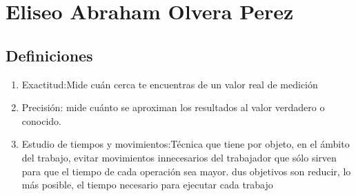 \section{Eliseo Abraham Olvera Perez}
\subsection{Definiciones}

\begin{enumerate}
    \item Exactitud:Mide cuán cerca te encuentras de un valor real de medición
    \item Precisión: mide cuánto se aproximan los resultados al valor verdadero o conocido.
    \item Estudio de  tiempos y movimientos:Técnica que tiene por objeto, en el ámbito del trabajo, evitar movimientos innecesarios del trabajador que sólo sirven para que el tiempo de cada operación sea mayor. dus objetivos son reducir, lo más posible, el tiempo necesario para ejecutar cada trabajo
\end{enumerate}